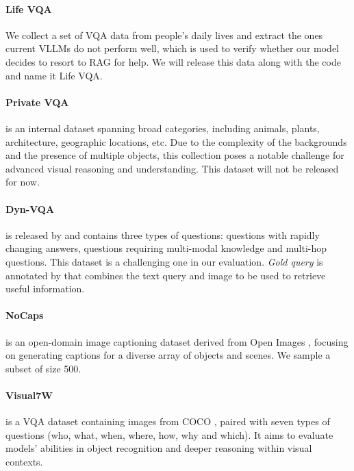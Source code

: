 \paragraph{Life VQA} We collect a set of VQA data from people's daily lives and extract the ones current VLLMs do not perform well, which is used to verify whether our model decides to resort to RAG for help. We will release this data along with the code and name it Life VQA. 

\paragraph{Private VQA} is an internal dataset spanning broad categories, including animals, plants, architecture, geographic locations, etc. Due to the complexity of the backgrounds and the presence of multiple objects, this collection poses a notable challenge for advanced visual reasoning and understanding. This dataset will not be released for now.

\paragraph{Dyn-VQA} is released by \citet{li2024benchmarkingmultimodalretrievalaugmented} and contains three types of questions: questions with rapidly changing answers, questions requiring multi-modal knowledge and multi-hop questions. This dataset is a challenging one in our evaluation. \textit{Gold query} is annotated by \citet{li2024benchmarkingmultimodalretrievalaugmented} that combines the text query and image to be used to retrieve useful information.

\paragraph{NoCaps} \cite{agrawal2019nocaps} is an open-domain image captioning dataset derived from Open Images \cite{openimages}, focusing on generating captions for a diverse array of objects and scenes. We sample a subset of size 500. 

\paragraph{Visual7W} \cite{zhu2016visual7w} is a VQA dataset containing images from COCO \cite{lin2014microsoft}, paired with seven types of questions (who, what, when, where, how, why and which). It aims to evaluate models' abilities in object recognition and deeper reasoning within visual contexts.

